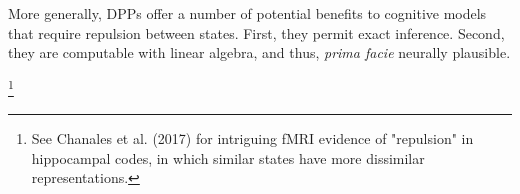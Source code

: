 \documentclass[10pt,letterpaper]{article}
\begin{document}
\nocite{behrens2018cognitive}
\nocite{cesana2018precursors}
\nocite{chanales2017overlap}
\nocite{dasgupta2017neural}
\nocite{dusek1997hippocampus}
\nocite{halberda2003development}
\nocite{gillenwater2012near}
\nocite{ko1995exact}
\nocite{knierim2014functional}
\nocite{kulesza2012determinantal}
\nocite{luck1997capacity}
\nocite{markman1988children}
\nocite{10.2307/2417171}
\nocite{merriman1989mutual}
\nocite{miller1956magical}
\nocite{mcclelland1995there}
\nocite{mody2016emergence}
\nocite{o1994hippocampal}
\nocite{quine2013word}
\nocite{treves1994computational}
\nocite{whittington2018generalisation}
\nocite{zeithamova2012hippocampus}






\setlength{\bibleftmargin}{.125in}
\setlength{\bibindent}{-\bibleftmargin}



More generally, DPPs offer a number of potential benefits to cognitive models that require repulsion between states. First, they permit exact inference. Second, they are computable with linear algebra, and thus, \textit{prima facie} neurally plausible.


\footnote{See Chanales et al. (2017) for intriguing fMRI evidence of "repulsion" in hippocampal codes, in which similar states have more dissimilar representations.}
\end{document}

